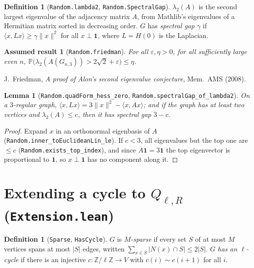 \documentclass[11pt]{amsart}
\newcommand{\leanname}[1]{\texttt{\textcolor{black!75}{#1}}}
\newcommand{\lfile}[1]{\texttt{#1}}
\newcommand{\Z}{\mathbb{Z}}
\newcommand{\PP}{\mathbb{P}}
\newcommand{\one}{\mathbf{1}}
\newcommand{\Q}{Q_{\ell,R}}
\newcommand{\Gnt}{G_{n,3}}
\theoremstyle{plain}
\newtheorem{lemma}[theorem]{Lemma}
\newtheorem{axiom}[theorem]{Assumed result}
\theoremstyle{definition}
\newtheorem{definition}[theorem]{Definition}
\theoremstyle{remark}
\begin{document}
\begin{definition}[\leanname{Random.lambda2}, \leanname{Random.SpectralGap}]
$\lambda_2(A)$ is the second largest eigenvalue of the adjacency matrix $A$, from Mathlib's
eigenvalues of a Hermitian matrix sorted in decreasing order. $G$ has \emph{spectral gap $\gamma$}
if $\langle x,Lx\rangle\ge\gamma\|x\|^2$ for all $x\perp\one$, where $L=H(0)$ is the Laplacian.
\end{definition}

\begin{axiom}[\leanname{Random.friedman}]\label{ax:friedman}
For all $\varepsilon,\eta>0$, for all sufficiently large even $n$,
$\PP\bigl(\lambda_2(A(\Gnt))>2\sqrt2+\varepsilon\bigr)\le\eta$.
\end{axiom}
\noindent J.~Friedman, \emph{A proof of Alon's second eigenvalue conjecture}, Mem.\ AMS (2008).

\begin{lemma}[\leanname{Random.quadForm\_hess\_zero}, \leanname{Random.spectralGap\_of\_lambda2}]
On a $3$-regular graph, $\langle x,Lx\rangle=3\|x\|^2-\langle x,Ax\rangle$; and if the graph has
at least two vertices and $\lambda_2(A)\le c$, then it has spectral gap $3-c$.
\end{lemma}
\begin{proof}
Expand $x$ in an orthonormal eigenbasis of $A$ (\leanname{Random.inner\_toEuclideanLin\_le}). If
$c<3$, all eigenvalues but the top one are $\le c$ (\leanname{Random.exists\_top\_index}), and since
$A\one=3\one$ the top eigenvector is proportional to $\one$, so $x\perp\one$ has no component
along it.
\end{proof}

\section{Extending a cycle to $\Q$ (\lfile{Extension.lean})}

\begin{definition}[\leanname{Sparse}, \leanname{HasCycle}]
$G$ is \emph{$M$-sparse} if every set $S$ of at most $M$ vertices spans at most $|S|$ edges,
written $\sum_{x\in S}|N(x)\cap S|\le2|S|$. $G$ \emph{has an $\ell$-cycle} if there is an injective
$c:\Z/\ell\Z\to V$ with $c(i)\sim c(i+1)$ for all $i$.
\end{definition}
\end{document}
